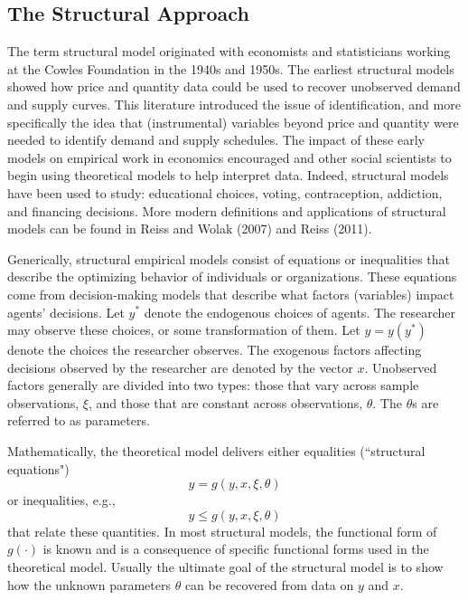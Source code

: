 \subsection{The Structural Approach}

The term structural model originated with economists and statisticians working at
the Cowles Foundation in the 1940s and 1950s.
The earliest structural models showed how price and quantity data could be used to recover unobserved demand and supply curves. 
This literature introduced the issue of identification, and more specifically the idea that (instrumental) variables beyond price and quantity were needed to identify demand and supply schedules. 
The impact of these early models on empirical work in economics encouraged and other social scientists to begin using theoretical models to help interpret data.
Indeed, structural models have been used to study: educational choices, voting, contraception, addiction, and financing decisions. 
More modern definitions and applications of structural models can be found in Reiss and Wolak (2007) and Reiss (2011). 

Generically, structural empirical models consist of equations or inequalities that describe the optimizing behavior of individuals or organizations.
These equations come from decision-making models that describe what factors (variables) impact agents' decisions.
Let $y^*$ denote the endogenous choices of agents. 
The researcher may observe these choices, or some transformation of them.
Let $y=y(y^*)$ denote the choices the researcher observes. 
The exogenous factors affecting decisions observed by the researcher are denoted by the vector $x$. 
Unobserved factors generally are divided into two types: those that vary across sample observations, $\xi$, and those that are constant across observations, $\theta$. 
The $\theta$s are referred to as parameters.

Mathematically, the theoretical model delivers either equalities (``structural equations")
$$  y = g(y, x,\xi ,\theta)$$ 
or inequalities, e.g.,
$$  y \le g(y, x,\xi ,\theta)$$
that relate these quantities. 
In most structural models, the functional form of $g(\cdot)$ is known and is a consequence of specific functional forms used in the theoretical model. 
Usually the ultimate goal of the structural model is to show how the unknown parameters $\theta$ can be recovered from data on $y$ and $x$. 

